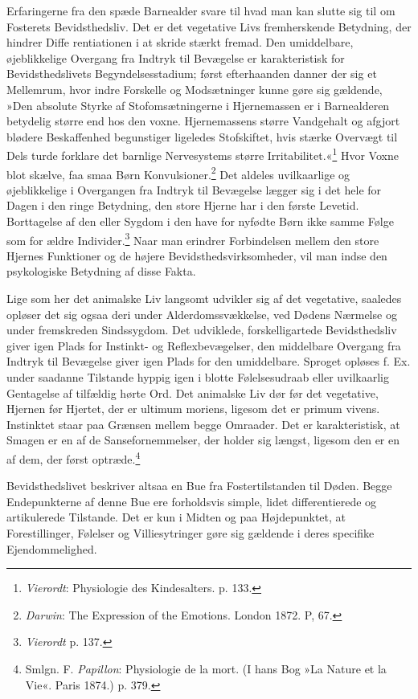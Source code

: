 \documentclass[12pt,a4paper,openany]{book}
\newcommand{\opage}[1]{\marginnote{\footnotesize\textit{[#1]}}}
\begin{document}
Erfaringerne fra den spæde Barnealder svare til hvad man kan slutte sig
til om Fosterets Bevidsthedsliv. Det er det vegetative Livs
fremherskende Betydning, der hindrer Diffe%
\opage{109}rentiationen i at skride stærkt fremad. Den umiddelbare,
øjeblikkelige Overgang fra Indtryk til Bevægelse er karakteristisk for
Bevidsthedslivets Begyndelsesstadium; først efterhaanden danner der sig
et Mellemrum, hvor indre Forskelle og Modsætninger kunne gøre sig
gældende, »Den absolute Styrke af Stofomsætningerne i Hjernemassen er i
Barnealderen betydelig større end hos den voxne. Hjernemassens større
Vandgehalt og afgjort blødere Beskaffenhed begunstiger ligeledes
Stofskiftet, hvis stærke Overvægt til Dels turde forklare det barnlige
Nervesystems større Irritabilitet.«\footnote[1]{\emph{Vierordt}: Physiologie
des Kindesalters. p. 133.} Hvor Voxne blot skælve, faa smaa Børn
Konvulsioner.\footnote[2]{\emph{Darwin}: The Expression of the Emotions.
London 1872. P, 67.} Det aldeles uvilkaarlige og øjeblikkelige i
Overgangen fra Indtryk til Bevægelse lægger sig i det hele for Dagen i
den ringe Betydning, den store Hjerne har i den første Levetid.
Borttagelse af den eller Sygdom i den have for nyfødte Børn ikke samme
Følge som for ældre Individer.\footnote[3]{\emph{Vierordt} p. 137.} Naar
man erindrer Forbindelsen mellem den store Hjernes Funktioner og de
højere Bevidsthedsvirksomheder, vil man indse den psykologiske Betydning
af disse Fakta.

Lige som her det animalske Liv langsomt udvikler sig af det vegetative,
saaledes opløser det sig ogsaa deri under Alderdomssvækkelse, ved Dødens
Nærmelse og under fremskreden Sindssygdom. Det udviklede,
forskelligartede Bevidsthedsliv giver igen Plads for Instinkt- og
Reflexbevægelser, den middelbare Overgang fra Indtryk til Bevægelse
giver igen Plads for den umiddelbare. Sproget opløses f. Ex. under
saadanne Tilstande hyppig igen i blotte Følelsesudraab eller uvilkaarlig
Gentagelse af tilfældig hørte Ord. Det animalske Liv dør før det
vegetative, Hjernen før Hjertet, der er ultimum moriens, ligesom det er
primum vivens. Instinktet staar paa Grænsen mellem begge Omraader. Det
er karakteristisk, at Smagen er en af de Sansefornemmelser, der holder
sig længst, ligesom den er en af dem, der først
optræde.\footnote[4]{Smlgn. F. \emph{Papillon}: Physiologie de la mort.
(I hans Bog »La Nature et la Vie«. Paris 1874.) p. 379.}


\opage{110}Bevidsthedslivet beskriver altsaa en Bue fra Fostertilstanden
til Døden. Begge Endepunkterne af denne Bue ere forholdsvis simple,
lidet differentierede og artikulerede Tilstande. Det er kun i Midten og
paa Højdepunktet, at Forestillinger, Følelser og Villiesytringer gøre
sig gældende i deres specifike Ejendommelighed.
\end{document}
